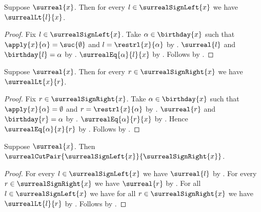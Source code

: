 \begin{proposition}\label{surreal_sign_left_below}
    Suppose $\surreal{x}$.
    Then for every $l\in\surrealSignLeft{x}$ we have
        $\surrealLt{l}{x}$.
\end{proposition}
\begin{proof}
    Fix $l\in\surrealSignLeft{x}$.
    Take $\alpha\in\birthday{x}$ such that
        $\apply{x}{\alpha}=\suc{\emptyset}$ and
        $l=\restrl{x}{\alpha}$
        by .
    $\surreal{l}$ and $\birthday{l}=\alpha$
        by .
    $\surrealEq{\alpha}{l}{x}$
        by .
    Follows by .
\end{proof}

\begin{proposition}\label{surreal_sign_right_above}
    Suppose $\surreal{x}$.
    Then for every $r\in\surrealSignRight{x}$ we have
        $\surrealLt{x}{r}$.
\end{proposition}
\begin{proof}
    Fix $r\in\surrealSignRight{x}$.
    Take $\alpha\in\birthday{x}$ such that
        $\apply{x}{\alpha}=\emptyset$ and
        $r=\restrl{x}{\alpha}$
        by .
    $\surreal{r}$ and $\birthday{r}=\alpha$
        by .
    $\surrealEq{\alpha}{r}{x}$
        by .
    Hence $\surrealEq{\alpha}{x}{r}$
        by .
    Follows by .
\end{proof}

\begin{theorem}\label{surreal_sign_cut_pair}
    Suppose $\surreal{x}$.
    Then $\surrealCutPair{\surrealSignLeft{x}}{\surrealSignRight{x}}$.
\end{theorem}
\begin{proof}
    For every $l\in\surrealSignLeft{x}$ we have $\surreal{l}$
        by .
    For every $r\in\surrealSignRight{x}$ we have $\surreal{r}$
        by .
    For all $l\in\surrealSignLeft{x}$ we have for all
        $r\in\surrealSignRight{x}$ we have $\surrealLt{l}{r}$
        by .
    Follows by .
\end{proof}

